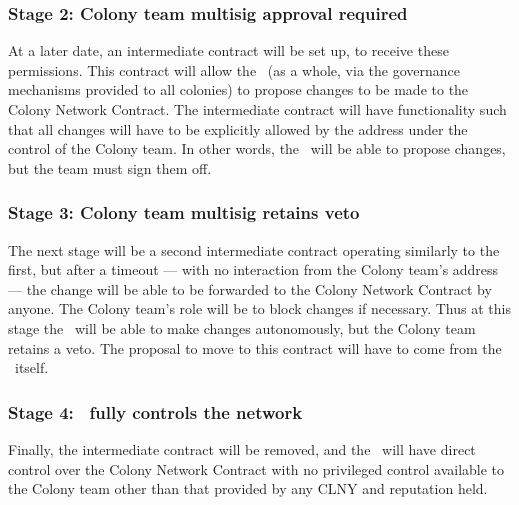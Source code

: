 \subsubsection*{Stage 2: Colony team multisig approval required}
At a later date, an intermediate contract will be set up, to receive these permissions. This contract will allow the \rc\ (as a whole, via the governance mechanisms provided to all colonies) to propose changes to be made to the Colony Network Contract. The intermediate contract will have functionality such that all changes will have to be explicitly allowed by the address under the control of the Colony team. In other words, the \rc\ will be able to propose changes, but the team must sign them off.

\subsubsection*{Stage 3: Colony team multisig retains veto}
The next stage will be a second intermediate contract operating similarly to the first, but after a timeout --- with no interaction from the Colony team's address --- the change will be able to be forwarded to the Colony Network Contract by anyone. The Colony team's role will be to block changes if necessary. Thus at this stage the \rc\ will be able to make changes autonomously, but the Colony team retains a veto.  The proposal to move to this contract will have to come from the \rc\ itself.

\subsubsection*{Stage 4: \rc\ fully controls the network}
Finally, the intermediate contract will be removed, and the \rc\ will have direct control over the Colony Network Contract with no privileged control available to the Colony team other than that provided by any CLNY and reputation held.
